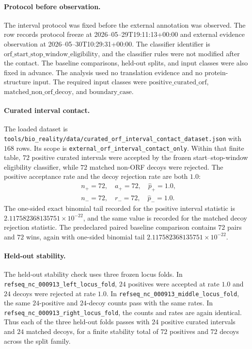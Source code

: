 \paragraph{Protocol before observation.}
The interval protocol was fixed before the external annotation was observed.  The row records protocol freeze at 2026--05--29T19:11:13+00:00 and external evidence observation at 2026--05--30T10:29:31+00:00.  The classifier identifier is $\mathrm{orf\_start\_stop\_window\_eligibility}$, and the classifier rules were not modified after the contact.  The baseline comparisons, held-out splits, and input classes were also fixed in advance.  The analysis used no translation evidence and no protein-structure input.  The required input classes were $\mathrm{positive\_curated\_orf}$, $\mathrm{matched\_non\_orf\_decoy}$, and $\mathrm{boundary\_case}$.

\paragraph{Curated interval contact.}
The loaded dataset is \texttt{tools/bio\_reality/data/curated\_orf\_interval\_contact\_dataset.json} with $168$ rows.  Its scope is \texttt{external\_orf\_interval\_contact\_only}.  Within that finite table, $72$ positive curated intervals were accepted by the frozen start--stop-window eligibility classifier, while $72$ matched non-ORF decoys were rejected.  The positive acceptance rate and the decoy rejection rate are both $1.0$:
$$
\begin{aligned}
&n_{+}=72,\quad a_{+}=72,\quad \widehat p_{+}=1.0,\\
&n_{-}=72,\quad r_{-}=72,\quad \widehat p_{-}=1.0.
\end{aligned}
$$
The one-sided exact binomial tail recorded for the positive interval statistic is $2.117582368135751\times 10^{-22}$, and the same value is recorded for the matched decoy rejection statistic.  The predeclared paired baseline comparison contains $72$ pairs and $72$ wins, again with one-sided binomial tail $2.117582368135751\times 10^{-22}$.

\paragraph{Held-out stability.}
The held-out stability check uses three frozen locus folds.  In \texttt{refseq\_nc\_000913\_left\_locus\_fold}, $24$ positives were accepted at rate $1.0$ and $24$ decoys were rejected at rate $1.0$.  In \texttt{refseq\_nc\_000913\_middle\_locus\_fold}, the same $24$-positive and $24$-decoy counts pass with the same rates.  In \texttt{refseq\_nc\_000913\_right\_locus\_fold}, the counts and rates are again identical.  Thus each of the three held-out folds passes with $24$ positive curated intervals and $24$ matched decoys, for a finite stability total of $72$ positives and $72$ decoys across the split family.

